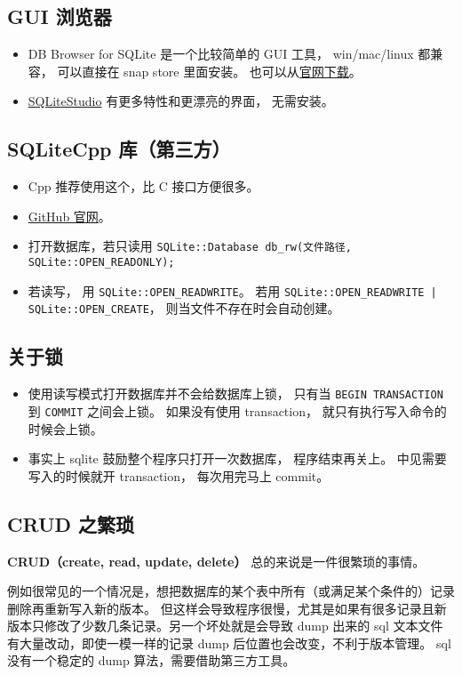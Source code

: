 \subsection{GUI 浏览器}
\begin{itemize}
\item DB Browser for SQLite 是一个比较简单的 GUI 工具， win/mac/linux 都兼容， 可以直接在 snap store 里面安装。 也可以从\href{https://sqlitebrowser.org/dl/}{官网下载}。
\item \href{https://sqlitestudio.pl/}{SQLiteStudio} 有更多特性和更漂亮的界面， 无需安装。
\end{itemize}

\subsection{SQLiteCpp 库（第三方）}

\begin{itemize}
\item Cpp 推荐使用这个，比 C 接口方便很多。
\item \href{https://github.com/SRombauts/SQLiteCpp}{GitHub 官网}。
\item 打开数据库，若只读用 \verb|SQLite::Database db_rw(文件路径, SQLite::OPEN_READONLY);|
\item 若读写， 用 \verb`SQLite::OPEN_READWRITE`。 若用 \verb`SQLite::OPEN_READWRITE | SQLite::OPEN_CREATE`， 则当文件不存在时会自动创建。
\end{itemize}

\subsection{关于锁}
\begin{itemize}
\item 使用读写模式打开数据库并不会给数据库上锁， 只有当 \verb|BEGIN TRANSACTION| 到 \verb|COMMIT| 之间会上锁。 如果没有使用 transaction， 就只有执行写入命令的时候会上锁。
\item 事实上 sqlite 鼓励整个程序只打开一次数据库， 程序结束再关上。 中见需要写入的时候就开 transaction， 每次用完马上 commit。
\end{itemize}

\subsection{CRUD 之繁琐}
\textbf{CRUD（create, read, update, delete）} 总的来说是一件很繁琐的事情。

例如很常见的一个情况是，想把数据库的某个表中所有（或满足某个条件的）记录删除再重新写入新的版本。 但这样会导致程序很慢，尤其是如果有很多记录且新版本只修改了少数几条记录。另一个坏处就是会导致 dump 出来的 sql 文本文件有大量改动，即使一模一样的记录 dump 后位置也会改变，不利于版本管理。 sql 没有一个稳定的 dump 算法，需要借助第三方工具。

